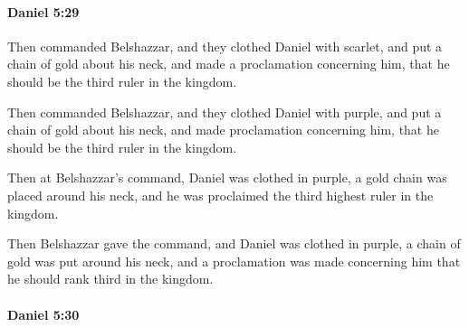 		\paragraph{Daniel 5:29} %
			\label{DANIEL-5-29}

			Then commanded Belshazzar, and they clothed Daniel with scarlet, and put a chain of gold about his neck, and made a proclamation concerning him, that he should be the third ruler in the kingdom.

			\begin{versebox}
					\item[BHS] 
					\item[LXX] 
					\item[ASV] Then commanded Belshazzar, and they clothed Daniel with purple, and put a chain of gold about his neck, and made proclamation concerning him, that he should be the third ruler in the kingdom.
					\item[NIV] Then at Belshazzar’s command, Daniel was clothed in purple, a gold chain was placed around his neck, and he was proclaimed the third highest ruler in the kingdom.
					\item[NRSV] Then Belshazzar gave the command, and Daniel was clothed in purple, a chain of gold was put around his neck, and a proclamation was made concerning him that he should rank third in the kingdom.
			\end{versebox}

		\paragraph{Daniel 5:30} %
			\label{DANIEL-5-30}

